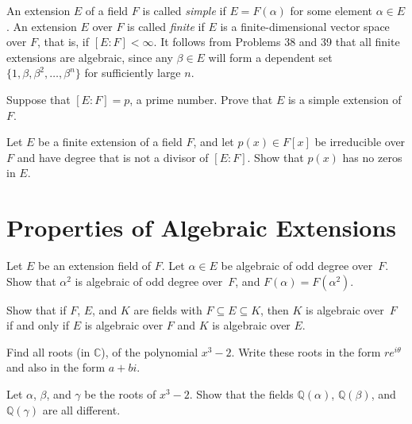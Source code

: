 An extension $E$ of a field $F$ is called \textit{simple} if $E=F(\alpha)$ for some element $\alpha \in E$. An extension $E$ over $F$ is called \textit{finite} if $E$ is a finite-dimensional vector space over $F$, that is, if $[E:F]<\infty$. It follows from Problems 38 and 39 that all finite extensions are algebraic, since any $\beta\in E$ will form a dependent set $\{1, \beta, \beta^2, \ldots,\beta^n\}$ for sufficiently large $n$.

\begin{problem}
    Suppose that $[E:F]=p$, a prime number. Prove that $E$ is a simple extension of $F$.
\end{problem}



\begin{problem}
Let $E$ be a finite extension of a field $F$, and let $p(x) \in F[x]$ be irreducible over $F$ and have degree that is not a divisor of $[E:F]$.  Show that $p(x)$ has no zeros in $E$.
\end{problem}



\section{Properties of Algebraic Extensions}

\begin{problem}
Let $E$ be an extension field of $F$.  Let $\alpha \in E$ be algebraic of odd degree over~$F$.  Show that $\alpha^2$ is algebraic of odd degree over~$F$, and $F(\alpha) = F(\alpha^2)$.
\end{problem}



\begin{problem}
Show that if $F$, $E$, and $K$ are fields with $F \subseteq E \subseteq K$, then $K$ is algebraic over~$F$ if and only if $E$ is algebraic over $F$ and $K$ is algebraic over $E$.
\end{problem}



\begin{problem}
    Find all roots (in $\mathbb{C}$), of the polynomial $x^3-2$. Write these roots in the form $re^{i\theta}$ and also in the form $a+bi$.
\end{problem}



\begin{problem}\label{prob:qabc}
Let $\alpha$, $\beta$, and $\gamma$ be the roots of $x^3-2$.  Show that the fields $\mathbb{Q}(\alpha)$, $\mathbb{Q}(\beta)$,  and $\mathbb{Q}(\gamma)$ are all different.
\end{problem}



